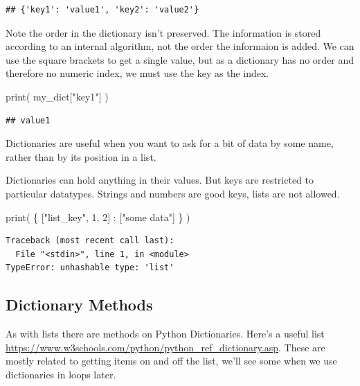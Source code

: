 \documentclass[]{book}
\newenvironment{Shaded}{\begin{snugshade}}{\end{snugshade}}
\newcommand{\BuiltInTok}[1]{#1}
\newcommand{\DecValTok}[1]{\textcolor[rgb]{0.00,0.00,0.81}{#1}}
\newcommand{\NormalTok}[1]{#1}
\newcommand{\StringTok}[1]{\textcolor[rgb]{0.31,0.60,0.02}{#1}}
\theoremstyle{definition}
\theoremstyle{definition}
\theoremstyle{definition}
\theoremstyle{remark}
\begin{document}
\begin{verbatim}
## {'key1': 'value1', 'key2': 'value2'}
\end{verbatim}

Note the order in the dictionary isn't preserved. The information is
stored according to an internal algorithm, not the order the informaion
is added. We can use the square brackets to get a single value, but as a
dictionary has no order and therefore no numeric index, we must use the
key as the index.

\begin{Shaded}
\begin{Highlighting}[]
\BuiltInTok{print}\NormalTok{( my_dict[}\StringTok{"key1"}\NormalTok{] )}
\end{Highlighting}
\end{Shaded}

\begin{verbatim}
## value1
\end{verbatim}

Dictionaries are useful when you want to ask for a bit of data by some
name, rather than by its position in a list.

Dictionaries can hold anything in their values. But keys are restricted
to particular datatypes. Strings and numbers are good keys, lists are
not allowed.

\begin{Shaded}
\begin{Highlighting}[]
\BuiltInTok{print}\NormalTok{( \{ [}\StringTok{"list_key"}\NormalTok{, }\DecValTok{1}\NormalTok{, }\DecValTok{2}\NormalTok{] : [}\StringTok{"some data"}\NormalTok{]  \} )}
\end{Highlighting}
\end{Shaded}

\begin{verbatim}
Traceback (most recent call last):
  File "<stdin>", line 1, in <module>
TypeError: unhashable type: 'list'
\end{verbatim}

\hypertarget{dictionary-methods}{%
\subsection{Dictionary Methods}\label{dictionary-methods}}

As with lists there are methods on Python Dictionaries. Here's a useful
list \url{https://www.w3schools.com/python/python_ref_dictionary.asp}.
These are mostly related to getting items on and off the list, we'll see
some when we use dictionaries in loops later.
\end{document}
